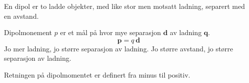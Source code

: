 En dipol er to ladde objekter, med like stor men motsatt ladning,
separert med en avstand.

Dipolmonement $p$ er et mål på hvor mye separasjon $\mathbf{d}$
av ladning $\mathbf{q}$.
$$\mathbf{p} = q\ \mathbf{d}$$
Jo mer ladning, jo større separasjon av ladning.
Jo større avstand, jo større separasjon av ladning.

Retningen på dipolmomentet er definert fra minus til positiv.
